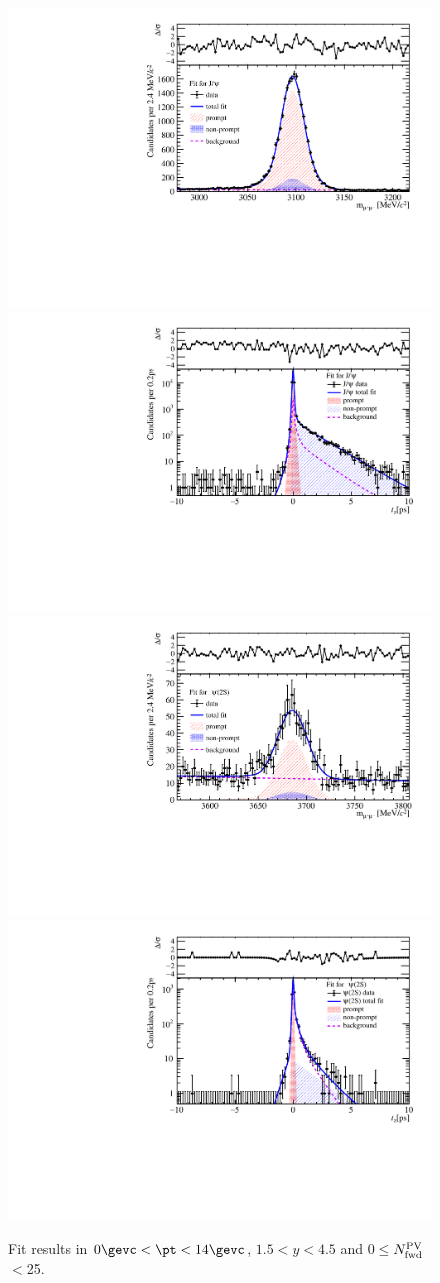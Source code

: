 \begin{figure}[H]
\begin{center}
\includegraphics[width=0.45\linewidth]{pdf/pPb/FWorkdir/TwoDimFit/ProjMass/Jpsi_n1y1pt1.pdf}
\includegraphics[width=0.45\linewidth]{pdf/pPb/FWorkdir/TwoDimFit/ProjTz/Jpsi_n1y1pt1.pdf}
\vspace*{-0.5cm}
\includegraphics[width=0.45\linewidth]{pdf/pPb/FWorkdir/TwoDimFit/ProjMass/Psi2S_n1y1pt1.pdf}
\includegraphics[width=0.45\linewidth]{pdf/pPb/FWorkdir/TwoDimFit/ProjTz/Psi2S_n1y1pt1.pdf}
\vspace*{-0.5cm}
\end{center}
\caption{Fit results in $0\gevc<\pt<14\gevc$, $1.5<y<4.5$ and 0$\leq$$N^{\rm PV}_{\rm fwd}$$<$25.}
\end{figure}
